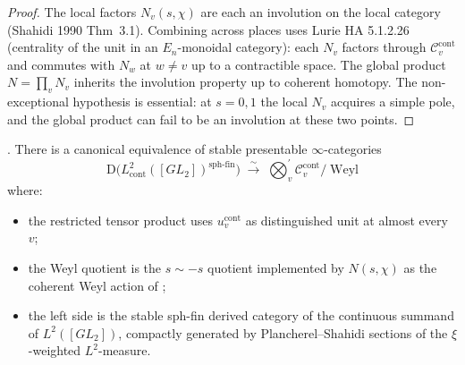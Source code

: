 \begin{proof}
The local factors \(N_{v}(s,\chi)\) are each an involution on the
local category (Shahidi 1990 Thm~3.1). Combining across places uses
Lurie HA 5.1.2.26 (centrality of the unit in an \(E_{n}\)-monoidal
category): each \(N_{v}\) factors through \(\mathcal{C}^{\mathrm{cont}}_{v}\)
and commutes with \(N_{w}\) at \(w\neq v\) up to a contractible space.
The global product \(N=\prod_{v}N_{v}\) inherits the involution
property up to coherent homotopy. The non-exceptional hypothesis is
essential: at \(s=0,1\) the local \(N_{v}\) acquires a simple pole, and
the global product can fail to be an involution at these two points.
\end{proof}

\begin{theorem}
\label{v4-arith:w6-d:thm:PW-lift}
\ClaimStatusProvedHere. There is a canonical equivalence of stable
presentable \(\infty\)-categories
\begin{equation}
\label{v4-arith:w6-d:eq:PW-lift}
\mathrm{D}\bigl(L^{2}_{\mathrm{cont}}([GL_{2}])^{\mathrm{sph\text{-}fin}}\bigr)\;\xrightarrow{\;\sim\;}\;\bigotimes_{v}^{\prime}\mathcal{C}^{\mathrm{cont}}_{v}\Big/\;\mathrm{Weyl}
\end{equation}
where:
\begin{itemize}
\item the restricted tensor product uses \(u^{\mathrm{cont}}_{v}\)
as distinguished unit at almost every \(v\);
\item the Weyl quotient is the \(s\sim -s\) quotient implemented by
\(N(s,\chi)\) as the coherent Weyl action of
;
\item the left side is the stable sph-fin derived category of the
continuous summand of \(L^{2}([GL_{2}])\), compactly generated by
Plancherel--Shahidi sections of the \(\xi\)-weighted \(L^{2}\)-measure.
\end{itemize}
\end{theorem}

